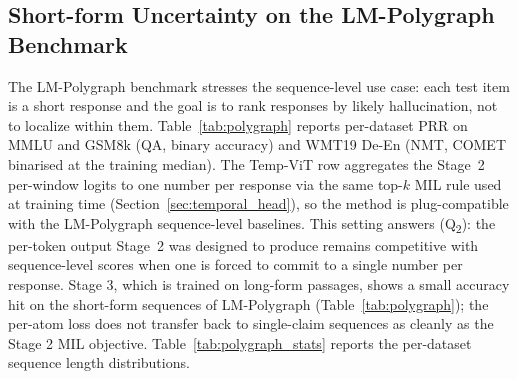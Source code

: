 \subsection{Short-form Uncertainty on the LM-Polygraph Benchmark}
\label{sec:polygraph}

The LM-Polygraph benchmark
\citep{fadeeva2023lmpolygraph,vashurin2025lmpolygraph} stresses the
sequence-level use case: each test item is a short response and the
goal is to rank responses by likely hallucination, not to localize
within them. Table~\ref{tab:polygraph} reports per-dataset PRR on
MMLU and GSM8k (QA, binary accuracy) and WMT19 De-En (NMT, COMET
binarised at the training median). The Temp-ViT row aggregates the
Stage~2 per-window logits to one number per response via the same
top-$k$ MIL rule used at training time
(Section~\ref{sec:temporal_head}), so the method is plug-compatible
with the LM-Polygraph sequence-level baselines. This setting answers
(Q\textsubscript{2}): the per-token output Stage~2 was designed to
produce remains competitive with sequence-level scores when one is
forced to commit to a single number per response. Stage 3, which is
trained on long-form passages, shows a small accuracy hit on the
short-form sequences of LM-Polygraph
(Table~\ref{tab:polygraph}); the per-atom loss does not transfer
back to single-claim sequences as cleanly as the Stage 2 MIL
objective.
Table~\ref{tab:polygraph_stats} reports the per-dataset sequence
length distributions.



